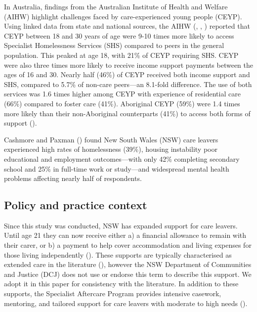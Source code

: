 \documentclass[
  jou,
  floatsintext,
  longtable,
  nolmodern,
  notxfonts,
  notimes,
  colorlinks=true,linkcolor=blue,citecolor=blue,urlcolor=blue]{apa7}
\begin{document}
In Australia, findings from the Australian Institute of Health and
Welfare (AIHW) highlight challenges faced by care-experienced young
people (CEYP). Using linked data from state and national sources, the
AIHW (,
,
) reported
that CEYP between 18 and 30 years of age were 9-10 times more likely to
access Specialist Homelessness Services (SHS) compared to peers in the
general population. This peaked at age 18, with 21\% of CEYP requiring
SHS. CEYP were also three times more likely to receive income support
payments between the ages of 16 and 30. Nearly half (46\%) of CEYP
received both income support and SHS, compared to 5.7\% of non-care
peers---an 8.1-fold difference. The use of both services was 1.6 times
higher among CEYP with experience of residential care (66\%) compared to
foster care (41\%). Aboriginal CEYP (59\%) were 1.4 times more likely
than their non-Aboriginal counterparts (41\%) to access both forms of
support ().

Cashmore and Paxman
() found New
South Wales (NSW) care leavers experienced high rates of homelessness
(39\%), housing instability poor educational and employment
outcomes---with only 42\% completing secondary school and 25\% in
full-time work or study---and widespread mental health problems
affecting nearly half of respondents.

\subsection{Policy and practice
context}\label{policy-and-practice-context}

Since this study was conducted, NSW has expanded support for care
leavers. Until age 21 they can now receive either a) a financial
allowance to remain with their carer, or b) a payment to help cover
accommodation and living expenses for those living independently
(). These supports are
typically characterised as extended care in the literature
(), however the NSW Department of Communities and Justice (DCJ) does
not use or endorse this term to describe this support. We adopt it in
this paper for consistency with the literature. In addition to these
supports, the Specialist Aftercare Program provides intensive casework,
mentoring, and tailored support for care leavers with moderate to high
needs ().
\end{document}

